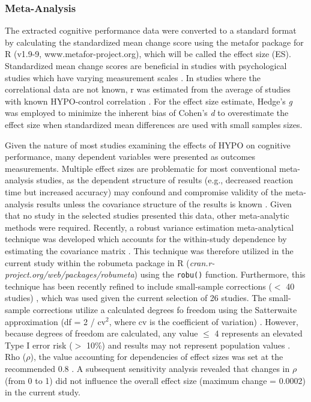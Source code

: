 \subsubsection{Meta-Analysis}
The extracted cognitive performance data were converted to a standard format by calculating the standardized mean change score using the metafor package for R (v1.9-9, www.metafor-project.org), which will be called the effect size (ES). Standardized mean change scores are beneficial in studies with psychological studies which have varying measurement scales \cite{morris_combining_2002}. In studies where the correlational data are not known, r was estimated from the average of studies with known HYPO-control correlation \cite{wittbrodt_fluid_2015,watson_mild_2015}. For the effect size estimate, Hedge’s \textit{g} was employed to minimize the inherent bias of Cohen’s \textit{d} to overestimate the effect size when standardized mean differences are used with small samples sizes.   

Given the nature of most studies examining the effects of HYPO on cognitive performance, many dependent variables were presented as outcomes measurements. Multiple effect sizes are problematic for most conventional meta-analysis studies, as the dependent structure of results (e.g., decreased reaction time but increased accuracy) may confound and compromise validity of the meta-analysis results unless the covariance structure of the results is known \cite{scammacca_meta-analysis_2014}. Given that no study in the selected studies presented this data, other meta-analytic methods were required. Recently, a robust variance estimation meta-analytical technique was developed which accounts for the within-study dependence by estimating the covariance matrix \cite{hedges_robust_2010}. This technique was therefore utilized in the current study within the robumeta package in R (\textit{cran.r-project.org/web/packages/robumeta}) using the \texttt{robu()} function. Furthermore, this technique has been recently refined to include small-sample corrections (${<}$ 40 studies) \cite{tipton_small_2015}, which was used given the current selection of 26 studies. The small-sample corrections utilize a calculated degrees fo freedom using the Satterwaite approximation (df = 2 / cv${^2}$, where cv is the coefficient of variation) \cite{tipton_small_2015}. However, because degrees of freedom are calculated, any value ${\le}$ 4 represents an elevated Type I error risk (${>}$ 10\%) and results may not represent population values \cite{tipton_small_2015}. Rho (${\rho}$), the value accounting for dependencies of effect sizes was set at the recommended 0.8 \cite{tanner-smith_robust_2014}. A subsequent sensitivity analysis revealed that changes in ${\rho}$ (from 0 to 1) did not influence the overall effect size (maximum change = 0.0002) in the current study.

